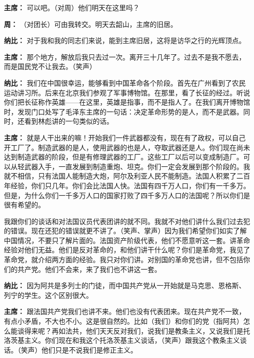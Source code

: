 \begin{duihua}
\item[\textbf{主席：}] 可以吧。（对周）他们明天在这里吗？

\item[\textbf{周：}] （对团长）可由我转交。明天去韶山，主席的旧居。

\item[\textbf{纳比：}] 对于我和我的同志们来说，能到主席旧居，这将是访华之行的光辉顶点。

\item[\textbf{主席：}] 那个地方，解放后我只去过一次。离开三十几年了。过去不是我不愿去，而是国民党不让我去。（笑声）

\item[\textbf{纳比：}] 我们在中国很幸运，能够看到中国革命各个阶段。首先在广州看到了农民运动讲习所。后来在北京我们参观了军事博物馆。在那里，看了长征的经过。听说你们把长征称作英雄——在这里，英雄是指事，而不是指人了。在我们离开博物馆时，发现门口处写了毛泽东主席的一句话：决定革命形势的是人，而不是武器。同时，还看到林彪讲的一句类似的话。

\item[\textbf{主席：}] 就是人干出来的嘛！开始我们一件武器都没有，现在有了政权，可以自己开工厂了。制造武器的是人，使用武器的也是人，夺取武器还是人。你们现在尚未达到制造武器的阶段，但是有修理武器的工厂。这些工厂以后可以变成制造厂。可以从轻武器入手，一直发展到制造重炮、坦克。你们一定会发展到那个阶段的。我就不相信，只有法国人能制造大炮，阿尔及利亚人民不能制造。法国人积累了二百年经验，你们只几年。你们会比法国人快。法国有四千万人口，你们有一千多万。但是，为什么你们一千多万人口的国家打败了四千多万人口的法国呢？所以你们是很有希望的。

我跟你们的谈话和对法国议员代表团讲的就不同。我就不对他们讲什么我们过去犯的错误。现在还犯的错误就更不讲了。（笑声、掌声）因为我们希望你们如实了解中国情况，不要只了解片面的。法国资产阶级代表，他们不愿意听这一套。讲革命经验对他们无益。他们是反对革命的，和他们讲干什么呢？你们是革命党，我见了革命党，就介绍两方面的经验。我只对你们讲。对别国的革命党也讲，但不包括你们的共产党。他们不会来，来了我们也不讲这一套。

\item[\textbf{纳比：}] 因为阿共是多列士的门徒，而中国共产党从一开始就是马克思、恩格斯、列宁的学生。这个区别很大。

\item[\textbf{主席：}] 跟法国共产党我们也讲不来。他们也没有代表团来。现在共产党不一致，有点小矛盾，不大也不小。这是很自然的。比如（我们）和你们的党（指阿共）怎么能谈得来呢？再如法共，他们天天反对我们，说我们是教条主义，又说我们是托洛茨基主义。你们现在和我这个托洛茨基主义谈话，（笑声）跟我这个教条主义谈话。（笑声）他们只是不说我们是修正主义。


\end{duihua}

